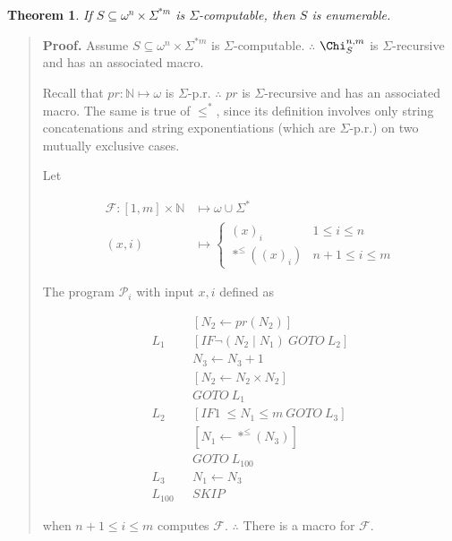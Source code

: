 \documentclass[a4paper, 12pt]{article}
\newtheorem{theorem}{Theorem}
\newtheorem{theorem}{Theorem}
\begin{document}
\begin{theorem}
    If $S \subseteq \omega^{n} \times \Sigma^{*m} $ is $\Sigma$-computable, then
    $S$ is enumerable.
\end{theorem}


\small
\begin{quote}

\textbf{Proof.} Assume $S \subseteq \omega^{n} \times \Sigma^{*m} $ is
$\Sigma$-computable. $\therefore $ $\Chi_{S}^{n, m}$ is $\Sigma$-recursive and
has an associated macro.

Recall that $pr : \mathbb{N} \mapsto \omega$ is
$\Sigma$-p.r. $\therefore $ $pr$ is $\Sigma$-recursive and has an associated
macro. The same is true of $\leq^{*}$, since its definition involves only string
concatenations and string exponentiations (which are $\Sigma$-p.r.) on two
mutually exclusive cases. 

Let

\begin{align*}
    \mathcal{F} : [1, m]  \times \mathbb{N} &\mapsto \omega \cup \Sigma^{*}  \\ 
    (x, i) &\mapsto \begin{cases}
        (x)_i & 1 \leq i \leq n \\
        *^{\leq} \left( (x)_i \right) & n + 1 \leq i \leq m
    \end{cases}
\end{align*}

The program $\mathcal{P}_i$ with input $x, i$ defined as

\begin{align*}
   &[N_2 \leftarrow pr(N_2)] \\
    L_1 ~ ~ ~ &[IF \neg (N_2 \mid N_1) ~ GOTO ~ L_2] \\
              & N_3 \leftarrow N_3 + 1 \\ 
              & [N_2 \leftarrow N_2 \times N_2] \\ 
              & GOTO ~ L_1 \\ 
    L_2 ~ ~ ~ & [IF 1~ \leq N_1 \leq m ~ GOTO ~ L_{3}]\\
    & [N_1 \leftarrow *^{\leq}(N_3)] \\ 
              &GOTO ~ L_{100} \\
    L_3 ~ ~ ~ & N_1 \leftarrow N_3 \\ 
    L_{100} ~ ~ ~ & SKIP
\end{align*}

when $n + 1 \leq i \leq m$ computes $\mathcal{F}$. $\therefore $ There is a
macro for $\mathcal{F}$.


\end{quote}
\end{document}
